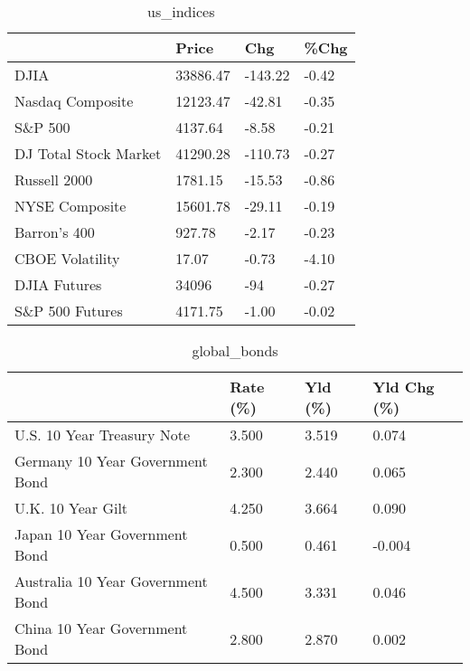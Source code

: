 \documentclass{article}%
\begin{document}
%


\begin{table}[htbp]%
\caption{us\_indices}%
\centering%
\begin{adjustbox}{width=1\textwidth}%
\begin{tabular}{llll}
\toprule
                      &    Price &     Chg &  \%Chg \\
\midrule
                 DJIA & 33886.47 & -143.22 & -0.42 \\
     Nasdaq Composite & 12123.47 &  -42.81 & -0.35 \\
              S\&P 500 &  4137.64 &   -8.58 & -0.21 \\
DJ Total Stock Market & 41290.28 & -110.73 & -0.27 \\
         Russell 2000 &  1781.15 &  -15.53 & -0.86 \\
       NYSE Composite & 15601.78 &  -29.11 & -0.19 \\
         Barron's 400 &   927.78 &   -2.17 & -0.23 \\
      CBOE Volatility &    17.07 &   -0.73 & -4.10 \\
         DJIA Futures &    34096 &     -94 & -0.27 \\
      S\&P 500 Futures &  4171.75 &   -1.00 & -0.02 \\
\bottomrule
\end{tabular}
%
\end{adjustbox}%
\end{table}

%


\begin{table}[htbp]%
\caption{global\_bonds}%
\centering%
\begin{adjustbox}{width=1\textwidth}%
\begin{tabular}{llll}
\toprule
                                  & Rate (\%) & Yld (\%) & Yld Chg (\%) \\
\midrule
       U.S. 10 Year Treasury Note &    3.500 &   3.519 &       0.074 \\
  Germany 10 Year Government Bond &    2.300 &   2.440 &       0.065 \\
                U.K. 10 Year Gilt &    4.250 &   3.664 &       0.090 \\
    Japan 10 Year Government Bond &    0.500 &   0.461 &      -0.004 \\
Australia 10 Year Government Bond &    4.500 &   3.331 &       0.046 \\
    China 10 Year Government Bond &    2.800 &   2.870 &       0.002 \\
\bottomrule
\end{tabular}
%
\end{adjustbox}%
\end{table}
\end{document}
